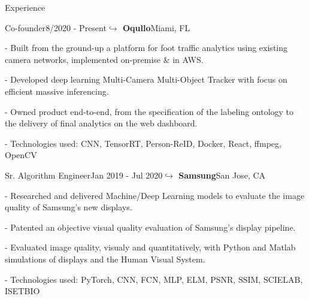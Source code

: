 \documentclass{resume} %
\begin{document}
% 



\vspace{-10pt}
\begin{rSection}{Experience}

\begin{rSubsection}{Co-founder}{8/2020 - Present}{\textbf{$\hookrightarrow$ Oqullo}}{Miami, FL}
\setlength{\itemindent}{.3in}
\item[-] Built from the ground-up a platform for foot traffic analytics using existing camera networks, implemented on-premise \& in AWS. 
\item[-] Developed deep learning Multi-Camera Multi-Object Tracker with focus on efficient massive inferencing.
\item[-] Owned product end-to-end, from the specification of the labeling ontology to the delivery of final analytics on the web dashboard.
\item[-] Technologies used: CNN, TensorRT, Person-ReID, Docker, React, ffmpeg, OpenCV
\end{rSubsection}

\begin{rSubsection}{Sr. Algorithm Engineer}{Jan 2019 - Jul 2020}{\textbf{$\hookrightarrow$ Samsung}}{San Jose, CA}
\setlength{\itemindent}{.3in}
\item[-] Researched and delivered Machine/Deep Learning models to evaluate the image quality of Samsung's new displays.
\item[-] Patented an objective visual quality evaluation of Samsung's display pipeline.
\item[-] Evaluated image quality, visualy and quantitatively, with Python and Matlab simulations of displays and the Human Visual System.
\item[-] Technologies used: PyTorch, CNN, FCN, MLP, ELM, PSNR, SSIM, SCIELAB, ISETBIO
\end{rSubsection}



\end{rSection}
\end{document}
